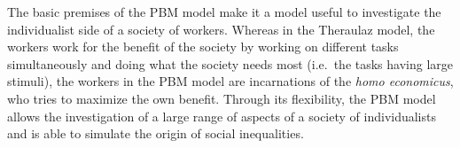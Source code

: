 
The basic premises of the PBM model make it a model useful to investigate the individualist side of a society of workers. Whereas in the Theraulaz model, the workers work for the benefit of the society by working on different tasks simultaneously and doing what the society needs most (i.e.\ the tasks having large stimuli), the workers in the PBM model are incarnations of the \emph{homo economicus}, who tries to maximize the own benefit. Through its flexibility, the PBM model allows the investigation of a large range of aspects of a society of individualists and is able to simulate the origin of social inequalities. 
